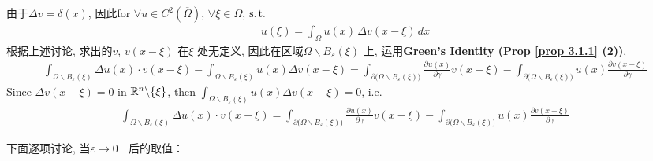 	\hspace*{-1.95em}由于$\Delta v = \delta(x)$, 因此for $\forall u \in C^2 \left( \overline{\Omega} \right)$, $\forall \xi \in \Omega$, $\operatorname{s.t.}$
	\begin{align*}
		u(\xi) = \int_{\Omega} u(x) \, \Delta v (x - \xi) \, dx
	\end{align*}
	根据上述讨论, 求出的$v$, $v(x - \xi)$ 在$\xi$ 处无定义, 因此在区域$\Omega \backslash B_{\varepsilon}(\xi)$ 上, 运用\textbf{Green's Identity (Prop \ref{prop 3.1.1} (2))}, 
	\begin{align*}
		\int_{\Omega \backslash B_{\varepsilon}(\xi)} \Delta u(x) \cdot v(x - \xi) 
		- \int_{\Omega \backslash B_{\varepsilon}(\xi)} u(x) \Delta v(x - \xi) 
		= \int_{\partial \Big( \Omega \backslash B_{\varepsilon}(\xi) \Big)} \frac{\partial u(x)}{\partial \gamma} v(x - \xi) 
		- \int_{\partial \Big( \Omega \backslash B_{\varepsilon}(\xi) \Big)} u(x) \frac{\partial v(x - \xi)}{\partial \gamma}
	\end{align*}
	Since $\Delta v(x - \xi) = 0$ in $\mathbb{R}^n \backslash \{ \xi \}$, then $\int_{\Omega \backslash B_{\varepsilon}(\xi)} u(x) \Delta v(x - \xi) = 0$, i.e.
	\begin{align*}
		\int_{\Omega \backslash B_{\varepsilon}(\xi)} \Delta u(x) \cdot v(x - \xi) 
		= \int_{\partial \Big( \Omega \backslash B_{\varepsilon}(\xi) \Big)} \frac{\partial u(x)}{\partial \gamma} v(x - \xi) 
		- \int_{\partial \Big( \Omega \backslash B_{\varepsilon}(\xi) \Big)} u(x) \frac{\partial v(x - \xi)}{\partial \gamma}
	\end{align*}
	
	\vspace*{2em}
	
	\hspace*{-1.95em}下面逐项讨论, 当$\varepsilon \to 0^+$ 后的取值：
	
	\newpage
	
